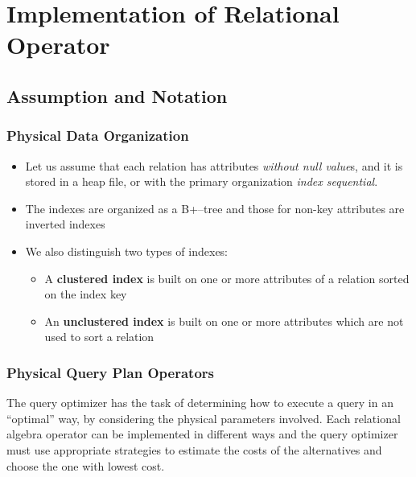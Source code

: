 \chapter{Implementation of Relational Operator}
\section{Assumption and Notation}

\subsection{Physical Data Organization}
\begin{itemize}
    \item Let us assume that each relation has attributes \textit{without null value}s, and it is stored in a heap file, or with the primary organization \textit{index sequential}.
    \item The indexes are organized as a B+–tree and those for non-key attributes are inverted indexes
    \item We also distinguish two types of indexes:
    \begin{itemize}
        \item A \textbf{clustered index} is built on one or more attributes of a relation sorted on the index key
        \item An \textbf{unclustered index} is built on one or more attributes which are not used to sort a relation
    \end{itemize}
\end{itemize}

\subsection{Physical Query Plan Operators}
\begin{tcolorbox}
The query optimizer has the task of determining how to execute a query in an “optimal” way, by considering the physical parameters involved. Each relational algebra operator can be implemented in different ways and the query optimizer must use appropriate strategies to estimate the costs of the alternatives and choose the one with lowest cost.
\end{tcolorbox}

